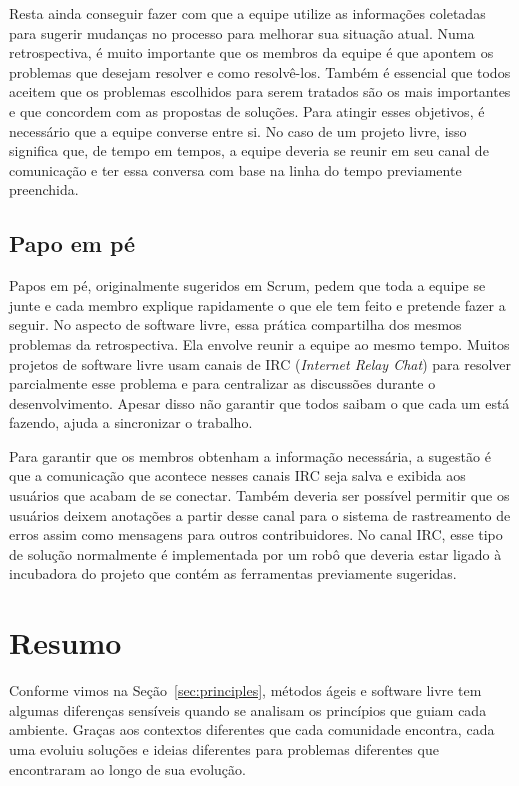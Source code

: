 Resta ainda conseguir fazer com que a equipe utilize as informações
coletadas para sugerir mudanças no processo para melhorar sua situação
atual. Numa retrospectiva, é muito importante que os membros da equipe
é que apontem os problemas que desejam resolver e como
resolvê-los. Também é essencial que todos aceitem que os problemas
escolhidos para serem tratados são os mais importantes e que concordem
com as propostas de soluções. Para atingir esses objetivos, é
necessário que a equipe converse entre si. No caso de um projeto
livre, isso significa que, de tempo em tempos, a equipe deveria se
reunir em seu canal de comunicação e ter essa conversa com base na
linha do tempo previamente preenchida.

\subsection{Papo em pé}
\label{subsec:stand-up}


Papos em pé, originalmente sugeridos em Scrum, pedem que toda a equipe
se junte e cada membro explique rapidamente o que ele tem feito e
pretende fazer a seguir. No aspecto de software livre, essa prática
compartilha dos mesmos problemas da retrospectiva. Ela envolve reunir
a equipe ao mesmo tempo. Muitos projetos de software livre usam canais
de IRC (\emph{Internet Relay Chat}) para resolver parcialmente esse
problema e para centralizar as discussões durante o
desenvolvimento. Apesar disso não garantir que todos saibam o que cada
um está fazendo, ajuda a sincronizar o trabalho.

Para garantir que os membros obtenham a informação necessária, a
sugestão é que a comunicação que acontece nesses canais IRC seja salva
e exibida aos usuários que acabam de se conectar. Também deveria ser
possível permitir que os usuários deixem anotações a partir desse
canal para o sistema de rastreamento de erros assim como mensagens
para outros contribuidores. No canal IRC, esse tipo de solução
normalmente é implementada por um robô que deveria estar ligado à
incubadora do projeto que contém as ferramentas previamente sugeridas.

\section{Resumo}
\label{sec:resumo-diffs}

Conforme vimos na Seção~\ref{sec:principles}, métodos ágeis e software
livre tem algumas diferenças sensíveis quando se analisam os
princípios que guiam cada ambiente. Graças aos contextos diferentes
que cada comunidade encontra, cada uma evoluiu soluções e ideias
diferentes para problemas diferentes que encontraram ao longo de sua
evolução.

